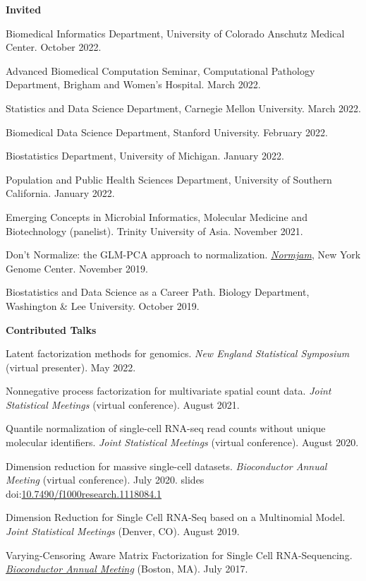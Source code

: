 \documentclass[10pt]{article}
\renewcommand{\section}[2]%
        {\pagebreak[2]\vspace{1.3\baselineskip}%
         \phantomsection\addcontentsline{toc}{section}{#1}%
         \hspace{0in}%
         \marginpar{
         \raggedright \scshape #1}#2}
\newcommand\doilink[1]{\href{https://dx.doi.org/#1}{#1}}
\newcommand\doi[1]{doi:\doilink{#1}}
\begin{document}
\section{Talks}
\textbf{Invited}
\begin{enumerate}[label= {[\arabic*]}]
\item Biomedical Informatics Department, University of Colorado Anschutz Medical Center. October 2022.
\item Advanced Biomedical Computation Seminar, Computational Pathology Department, Brigham and Women's Hospital. March 2022.
\item Statistics and Data Science Department, Carnegie Mellon University. March 2022.
\item Biomedical Data Science Department, Stanford University. February 2022.
\item Biostatistics Department, University of Michigan. January 2022.
\item Population and Public Health Sciences Department, University of Southern California. January 2022.
\item Emerging Concepts in Microbial Informatics, Molecular Medicine and Biotechnology (panelist). Trinity University of Asia. November 2021.
\item Don't Normalize: the GLM-PCA approach to normalization. \href{https://normjam.github.io/}{{\it Normjam}}, New York Genome Center. November 2019.
\item Biostatistics and Data Science as a Career Path. Biology Department, Washington \& Lee University. October 2019.
\end{enumerate}

\textbf{Contributed Talks}
\begin{enumerate}[label= {[\arabic*]}]
\item Latent factorization methods for genomics. {\it New England Statistical Symposium} (virtual presenter). May 2022.
\item Nonnegative process factorization for multivariate spatial count data. {\it Joint Statistical Meetings} (virtual conference). August 2021.
\item Quantile normalization of single-cell RNA-seq read counts without unique molecular identifiers. {\it Joint Statistical Meetings} (virtual conference). August 2020.
\item Dimension reduction for massive single-cell datasets. {\it Bioconductor Annual Meeting} (virtual conference). July 2020. slides \doi{10.7490/f1000research.1118084.1}
\item Dimension Reduction for Single Cell RNA-Seq based on a Multinomial Model. {\it Joint Statistical Meetings} (Denver, CO). August 2019.
\item Varying-Censoring Aware Matrix Factorization for Single Cell RNA-Sequencing. \href{https://www.bioconductor.org/help/course-materials/2017/BioC2017/}{{\it Bioconductor Annual Meeting}} (Boston, MA). July 2017.
\end{enumerate}
\end{document}
